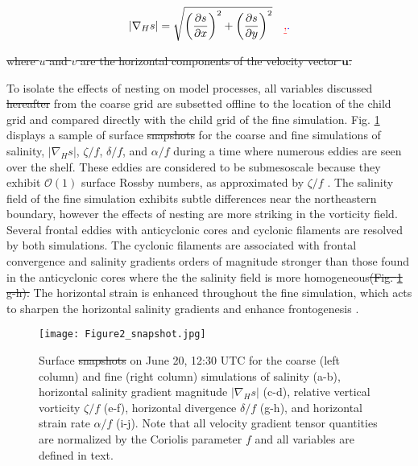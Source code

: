 \documentclass[draft]{agujournal2019}
\providecommand{\DIFadd}[1]{{\protect\color{blue}\uwave{#1}}} %
\providecommand{\DIFdel}[1]{{\protect\color{red}\sout{#1}}}                      %
\providecommand{\DIFaddbegin}{} %
\providecommand{\DIFaddend}{} %
\providecommand{\DIFdelbegin}{} %
\providecommand{\DIFdelend}{} %
\providecommand{\DIFaddFL}[1]{\DIFadd{#1}} %
\providecommand{\DIFdelFL}[1]{\DIFdel{#1}} %
\providecommand{\DIFaddbeginFL}{} %
\providecommand{\DIFaddendFL}{} %
\providecommand{\DIFdelbeginFL}{} %
\providecommand{\DIFdelendFL}{} %
\begin{document}
\begin{linenomath*}
\begin{equation}
    |\nabla_H s| = \sqrt{\bigg(\frac{\partial s}{\partial x} \bigg) ^2 + \bigg(\frac{\partial s}{\partial y} \bigg)^2} \quad \DIFdelbegin \DIFdel{,
}\DIFdelend \DIFaddbegin \DIFadd{.
}\DIFaddend \end{equation}
\end{linenomath*}
\DIFdelbegin \DIFdel{where $u$ and $v$ are the horizontal components of the velocity vector $\mathbf{u}$. 
}\DIFdelend 

To isolate the effects of nesting on model processes, all variables discussed \DIFdelbegin \DIFdel{hereafter }\DIFdelend \DIFaddbegin \DIFadd{hereinafter }\DIFaddend from the coarse grid are subsetted offline to the location of the child grid and compared directly with the child grid of the fine simulation. Fig. \ref{fig:surface_snapshots} displays a sample of surface \DIFdelbegin \DIFdel{snapshots }\DIFdelend \DIFaddbegin \DIFadd{fields }\DIFaddend for the coarse and fine simulations of salinity, $|\nabla_H s|$, $\zeta/f$, $\delta/f$, and $\alpha/f$ during a time where numerous eddies are seen over the shelf. These eddies are considered to be submesoscale because they exhibit $\mathcal{O}(1)$ surface Rossby numbers, as approximated by $\zeta/f$ \cite{Barkan_2017, Kobashi_2020, McWilliams_2016}. The salinity field of the fine simulation exhibits subtle differences near the northeastern boundary, however the effects of nesting are more striking in the vorticity field. Several frontal eddies with anticyclonic cores and cyclonic filaments are resolved by both simulations. The cyclonic filaments are \DIFaddbegin \DIFadd{often }\DIFaddend associated with frontal convergence \cite{Kobashi_2020} and salinity gradients orders of magnitude stronger than those found in the anticyclonic cores where the the salinity field is more homogeneous\DIFdelbegin \DIFdel{(Fig. \ref{fig:surface_snapshots}  g-h). }\DIFdelend \DIFaddbegin \DIFadd{. }\DIFaddend The horizontal strain \DIFaddbegin \DIFadd{rate }\DIFaddend is enhanced throughout the fine simulation, which acts to sharpen the horizontal salinity gradients and enhance frontogenesis \cite{Hoskins_1972}.

\begin{figure} 
 \centerline{\texttt{[image: Figure2\_snapshot.jpg]}}
  \caption{Surface \DIFdelbeginFL \DIFdelFL{snapshots }\DIFdelendFL \DIFaddbeginFL \DIFaddFL{fields }\DIFaddendFL on June 20, 12:30 UTC for the coarse (left column) and fine (right column) simulations of salinity (a-b), horizontal salinity gradient magnitude $|\nabla_H s|$ (c-d), relative vertical vorticity $\zeta/f$ (e-f), horizontal divergence $\delta/f$ (g-h), and horizontal strain rate $\alpha/f$ (i-j). Note that all velocity gradient tensor quantities are normalized by the Coriolis parameter $f$ and all variables are defined in text.}
  \label{fig:surface_snapshots}
\end{figure} 
\end{document}

